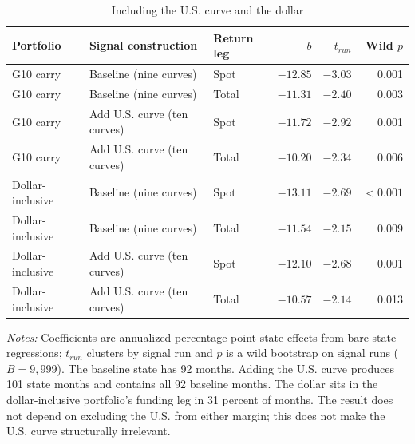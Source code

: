 \begin{table}[H]
\centering
\caption{Including the U.S. curve and the dollar}
\label{tab:v03-us-inclusion}
\small
\begin{tabular}{lllrrr}
\toprule
Portfolio & Signal construction & Return leg & $b$ & $t_{run}$ & Wild $p$ \\
\midrule
G10 carry & Baseline (nine curves) & Spot & $-12.85$ & $-3.03$ & 0.001 \\
G10 carry & Baseline (nine curves) & Total & $-11.31$ & $-2.40$ & 0.003 \\
G10 carry & Add U.S. curve (ten curves) & Spot & $-11.72$ & $-2.92$ & 0.001 \\
G10 carry & Add U.S. curve (ten curves) & Total & $-10.20$ & $-2.34$ & 0.006 \\
Dollar-inclusive & Baseline (nine curves) & Spot & $-13.11$ & $-2.69$ & $<0.001$ \\
Dollar-inclusive & Baseline (nine curves) & Total & $-11.54$ & $-2.15$ & 0.009 \\
Dollar-inclusive & Add U.S. curve (ten curves) & Spot & $-12.10$ & $-2.68$ & 0.001 \\
Dollar-inclusive & Add U.S. curve (ten curves) & Total & $-10.57$ & $-2.14$ & 0.013 \\
\bottomrule
\end{tabular}

\begin{minipage}{0.95\textwidth}
\footnotesize\emph{Notes:} Coefficients are annualized percentage-point state effects from bare state regressions; $t_{run}$ clusters by signal run and $p$ is a wild bootstrap on signal runs ($B=9{,}999$). The baseline state has 92 months. Adding the U.S. curve produces 101 state months and contains all 92 baseline months. The dollar sits in the dollar-inclusive portfolio's funding leg in 31 percent of months. The result does not depend on excluding the U.S. from either margin; this does not make the U.S. curve structurally irrelevant.
\end{minipage}
\end{table}

